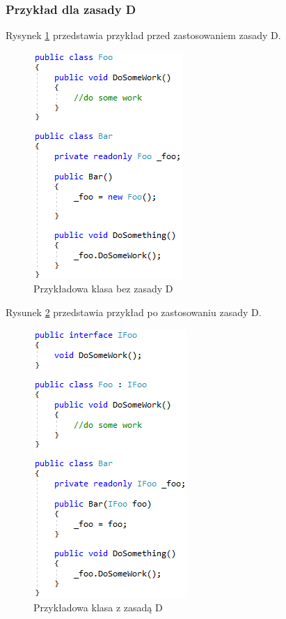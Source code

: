 \documentclass[12pt]{article}
\begin{document}
\subsubsection{Przykład dla zasady D}
Rysynek \ref{fig:Solid_without} przedstawia przykład przed zastosowaniem zasady D.\\
\begin{figure}[H]
	\begin{center}
  		\includegraphics{Solid_without.png}
  		\caption{Przykładowa klasa bez zasady D}
  		\label{fig:Solid_without}
	\end{center}
\end{figure}
Rysunek \ref{fig:Solid_with} przedstawia przykład po zastosowaniu zasady D.\\
\begin{figure}[H]
	\begin{center}
  		\includegraphics{Solid_with.png}
  		\caption{Przykładowa klasa z zasadą D}
  		\label{fig:Solid_with}
	\end{center}
\end{figure}
\end{document}
